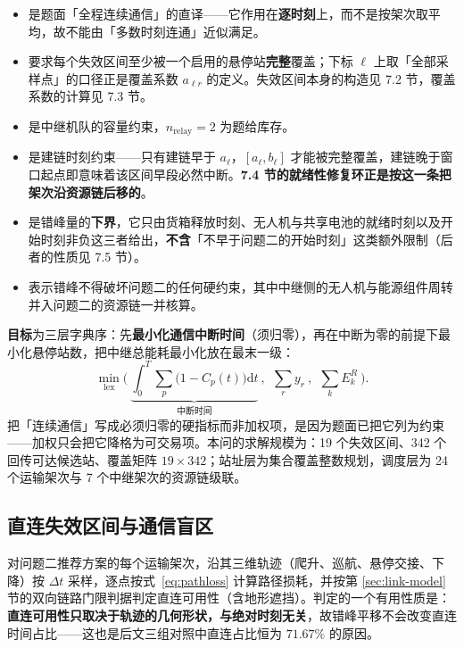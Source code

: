 \begin{itemize}
	\item[(C1)] 是题面「全程连续通信」的直译——它作用在\textbf{逐时刻}上，而不是按架次取平均，故不能由「多数时刻连通」近似满足。
	\item[(C2)] 要求每个失效区间至少被一个启用的悬停站\textbf{完整}覆盖；下标 $\ell$ 上取「全部采样点」的口径正是覆盖系数 $a_{\ell r}$ 的定义。失效区间本身的构造见 7.2 节，覆盖系数的计算见 7.3 节。
	\item[(C3)] 是中继机队的容量约束，$n_{\mathrm{relay}}=2$ 为题给库存。
	\item[(C4)] 是建链时刻约束——只有建链早于 $a_\ell$，$[a_\ell,b_\ell]$ 才能被完整覆盖，建链晚于窗口起点即意味着该区间早段必然中断。\textbf{7.4 节的就绪性修复环正是按这一条把架次沿资源链后移的}。
	\item[(C5)] 是错峰量的\textbf{下界}，它只由货箱释放时刻、无人机与共享电池的就绪时刻以及开始时刻非负这三者给出，\textbf{不含}「不早于问题二的开始时刻」这类额外限制（后者的性质见 7.5 节）。
	\item[(C6)] 表示错峰不得破坏问题二的任何硬约束，其中中继侧的无人机与能源组件周转并入问题二的资源链一并核算。
\end{itemize}

\textbf{目标}为三层字典序：先\textbf{最小化通信中断时间}（须归零），再在中断为零的前提下最小化悬停站数，把中继总能耗最小化放在最末一级：
\begin{equation}
	\min_{\mathrm{lex}}\Big(\ \underbrace{\int_0^{T}\sum_{p}\bigl(1-C_p(t)\bigr)\mathrm{d}t}_{\text{中断时间}}\ ,\ \ \sum_{r} y_r\ ,\ \ \sum_{k} E^{R}_k\ \Big).
	\label{eq:q3-lex}
\end{equation}
把「连续通信」写成必须归零的硬指标而非加权项，是因为题面已把它列为约束——加权只会把它降格为可交易项。本问的求解规模为：19 个失效区间、342 个回传可达候选站、覆盖矩阵 $19\times342$；站址层为集合覆盖整数规划，调度层为 24 个运输架次与 7 个中继架次的资源链级联。

\subsection{直连失效区间与通信盲区}

对问题二推荐方案的每个运输架次，沿其三维轨迹（爬升、巡航、悬停交接、下降）按 $\Delta t$ 采样，逐点按式~\eqref{eq:pathloss} 计算路径损耗，并按第 \ref{sec:link-model} 节的双向链路门限判据判定直连可用性（含地形遮挡）。判定的一个有用性质是：\textbf{直连可用性只取决于轨迹的几何形状，与绝对时刻无关}，故错峰平移不会改变直连时间占比——这也是后文三组对照中直连占比恒为 $71.67\%$ 的原因。

